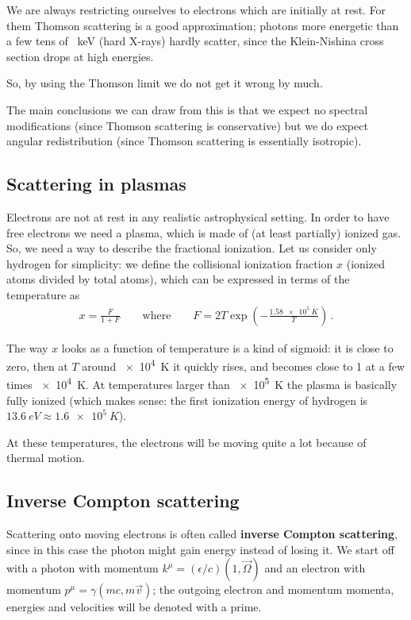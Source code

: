 \documentclass[main.tex]{subfiles}
\begin{document}
We are always restricting ourselves to electrons which are initially at rest. For them Thomson scattering is a good approximation; photons more energetic than a few tens of \SI{}{keV} (hard X-rays) hardly scatter, since the Klein-Nishina cross section drops at high energies.

So, by using the Thomson limit we do not get it wrong by much. 

The main conclusions we can draw from this is that we expect no spectral modifications (since Thomson scattering is conservative) but we do expect angular redistribution (since Thomson scattering is essentially isotropic).

\subsection{Scattering in plasmas}

Electrons are not at rest in any realistic astrophysical setting. In order to have free electrons we need a plasma, which is made of (at least partially) ionized gas. 
So, we need a way to describe the fractional ionization.
Let us consider only hydrogen for simplicity: we define the collisional ionization fraction \(x\) (ionized atoms divided by total atoms), which can be expressed in terms of the temperature as 
%
\begin{align}
x = \frac{F}{1 + F} 
\qquad \text{where} \qquad
F = 2T \exp(-\frac{\SI{1.58e5}{K}}{T})
\,.
\end{align}

The way \(x\) looks as a function of temperature is a kind of sigmoid: it is close to zero, then at \(T\) around \SI{e4}{K} it quickly rises, and becomes close to 1 at a few times \SI{e4}{K}. At temperatures larger than \SI{e5}{K} the plasma is basically fully ionized (which makes sense: the first ionization energy of hydrogen is \(\SI{13.6}{eV} \approx \SI{1.6e5}{K}\)). 

At these temperatures, the electrons will be moving quite a lot because of thermal motion. 

\subsection{Inverse Compton scattering}

Scattering onto moving electrons is often called \textbf{inverse Compton scattering}, since in this case the photon might gain energy instead of losing it. 
We start off with a photon with momentum \(k^{\mu } = (\epsilon /c) (1, \vec{\Omega})\) and an electron with momentum \(p^{\mu } = \gamma (mc, m \vec{v})\); the outgoing electron and momentum momenta, energies and velocities will be denoted with a prime. 
\end{document}
